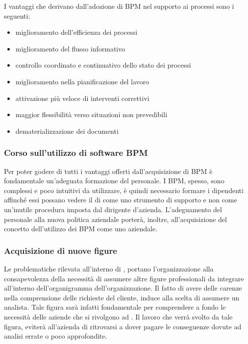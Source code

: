 I vantaggi che derivano dall'adozione di \sw BPM nel supporto ai processi sono i seguenti:

\begin{itemize}
	\item miglioramento dell'efficienza dei processi
	\item miglioramento del flusso informativo
	\item controllo coordinato e continuativo dello stato dei processi
	\item miglioramento nella pianificazione del lavoro
	\item attivazione più veloce di interventi correttivi
	\item maggior flessibilità verso situazioni non prevedibili
	\item dematerializzazione dei documenti 	
\end{itemize}


\subsubsection{Corso sull'utilizzo di software BPM}
Per poter godere di tutti i vantaggi offerti dall'acquisizione di \sw BPM è fondamentale un'adeguata formazione del personale. I \sw BPM, spesso, sono complessi e poco intuitivi da utilizzare, è quindi necessario formare i dipendenti affinché essi possano 
vedere il \sw di  come uno strumento di supporto e non come un'inutile procedura imposta dal dirigente d'azienda.
L'adeguamento del personale alla nuova politica aziendale porterà, inoltre, all'acquisizione del concetto dell'utilizzo dei \sw BPM come uno  aziendale.

\subsubsection{Acquisizione di nuove figure}
Le problematiche rilevata all'interno di \customer , portano l'organizzazione alla consapevolezza della necessità di assumere altre figure professionali da integrare all'interno dell'organigramma dell'organizzazione.
Il fatto di avere delle carenze nella comprensione delle richieste del cliente, induce \customer alla scelta di assumere un analista. Tale figura sarà infatti fondamentale per comprendere a fondo le necessità delle aziende che si rivolgono ad \customer. Il lavoro che verrà svolto da tale figura, eviterà all'azienda di ritrovarsi a dover pagare le conseguenze dovute ad analisi errate o poco approfondite.

